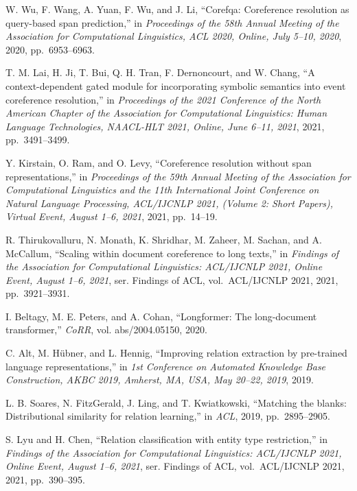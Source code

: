 \begin{enumerate}[leftmargin=2em,label={[\arabic*]}]
\item W. Wu, F. Wang, A. Yuan, F. Wu, and J. Li, ``Corefqa: Coreference resolution as query-based span prediction,'' in \textit{Proceedings of the 58th Annual Meeting of the Association for Computational Linguistics, ACL 2020, Online, July 5--10, 2020}, 2020, pp.~6953--6963.

\item T. M. Lai, H. Ji, T. Bui, Q. H. Tran, F. Dernoncourt, and W. Chang, ``A context-dependent gated module for incorporating symbolic semantics into event coreference resolution,'' in \textit{Proceedings of the 2021 Conference of the North American Chapter of the Association for Computational Linguistics: Human Language Technologies, NAACL-HLT 2021, Online, June 6--11, 2021}, 2021, pp.~3491--3499.

\item Y. Kirstain, O. Ram, and O. Levy, ``Coreference resolution without span representations,'' in \textit{Proceedings of the 59th Annual Meeting of the Association for Computational Linguistics and the 11th International Joint Conference on Natural Language Processing, ACL/IJCNLP 2021, (Volume 2: Short Papers), Virtual Event, August 1--6, 2021}, 2021, pp.~14--19.

\item R. Thirukovalluru, N. Monath, K. Shridhar, M. Zaheer, M. Sachan, and A. McCallum, ``Scaling within document coreference to long texts,'' in \textit{Findings of the Association for Computational Linguistics: ACL/IJCNLP 2021, Online Event, August 1--6, 2021}, ser. Findings of ACL, vol.~ACL/IJCNLP 2021, 2021, pp.~3921--3931.

\item I. Beltagy, M. E. Peters, and A. Cohan, ``Longformer: The long-document transformer,'' \textit{CoRR}, vol. abs/2004.05150, 2020.

\item C. Alt, M. H\"{u}bner, and L. Hennig, ``Improving relation extraction by pre-trained language representations,'' in \textit{1st Conference on Automated Knowledge Base Construction, AKBC 2019, Amherst, MA, USA, May 20--22, 2019}, 2019.

\item L. B. Soares, N. FitzGerald, J. Ling, and T. Kwiatkowski, ``Matching the blanks: Distributional similarity for relation learning,'' in \textit{ACL}, 2019, pp.~2895--2905.

\item S. Lyu and H. Chen, ``Relation classification with entity type restriction,'' in \textit{Findings of the Association for Computational Linguistics: ACL/IJCNLP 2021, Online Event, August 1--6, 2021}, ser. Findings of ACL, vol.~ACL/IJCNLP 2021, 2021, pp.~390--395.


\end{enumerate}

